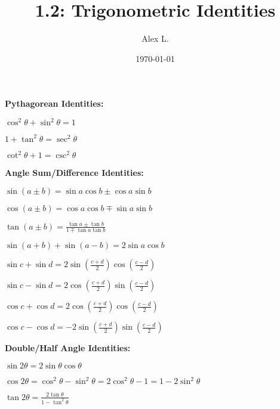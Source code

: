 \documentclass{article}
\title{1.2: Trigonometric Identities}
\author{Alex L.}
\date{\today}
\begin{document}
\maketitle

\textbf{Pythagorean Identities:}

$\cos^2 \theta + \sin^2\theta = 1$

$1+\tan^2\theta = \sec^2\theta$

$\cot^2\theta + 1 = \csc^2\theta$


\textbf{Angle Sum/Difference Identities:}

$\sin(a\pm b) = \sin a \cos b \pm \cos a \sin b$

$\cos(a\pm b) = \cos a \cos b \mp \sin a \sin b$

$\tan(a\pm b) = \frac{\tan a \pm \tan b}{1 \mp \tan a\tan b}$

$\sin(a+b) + \sin(a-b) = 2\sin a \cos b$

$\sin c + \sin d = 2\sin(\frac{c+d}{2})\cos(\frac{c-d}{2})$

$\sin c - \sin d = 2\cos(\frac{c+d}{2})\sin(\frac{c-d}{2})$

$\cos c + \cos d = 2\cos(\frac{c+d}{2})\cos(\frac{c-d}{2})$

$\cos c - \cos d = -2\sin(\frac{c+d}{2})\sin(\frac{c-d}{2})$

\textbf{Double/Half Angle Identities:}

$\sin 2\theta = 2\sin\theta\cos\theta$

$\cos 2\theta = \cos^2\theta - \sin^2\theta = 2\cos^2\theta-1 = 1-2\sin^2\theta$

$\tan 2\theta = \frac{2\tan\theta}{1-\tan^2\theta}$
\end{document}
